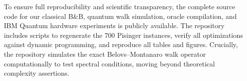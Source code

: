 \documentclass[conference]{IEEEtran} \IEEEoverridecommandlockouts
\begin{document}
To ensure full reproducibility and scientific transparency, the complete source code for our classical B\&B, quantum walk simulation, oracle compilation, and IBM Quantum hardware experiments is publicly available. The repository includes scripts to regenerate the 700 Pisinger instances, verify all optimizations against dynamic programming, and reproduce all tables and figures. Crucially, the repository simulates the exact Belovs--Montanaro walk operator computationally to test spectral conditions, moving beyond theoretical complexity assertions.










 
\end{document}
